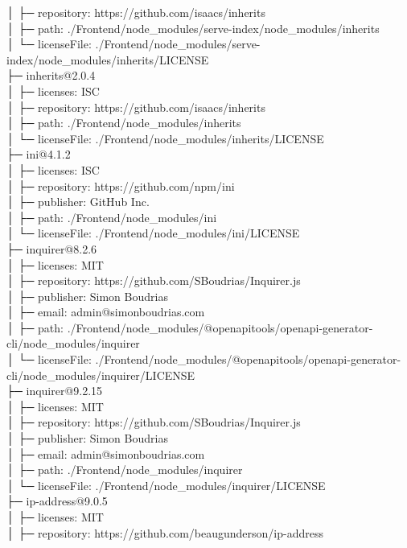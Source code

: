 │  ├─ repository: https://github.com/isaacs/inherits\\
│  ├─ path: ./Frontend/node\_modules/serve-index/node\_modules/inherits\\
│  └─ licenseFile: ./Frontend/node\_modules/serve-index/node\_modules/inherits/LICENSE\\
├─ inherits@2.0.4\\
│  ├─ licenses: ISC\\
│  ├─ repository: https://github.com/isaacs/inherits\\
│  ├─ path: ./Frontend/node\_modules/inherits\\
│  └─ licenseFile: ./Frontend/node\_modules/inherits/LICENSE\\
├─ ini@4.1.2\\
│  ├─ licenses: ISC\\
│  ├─ repository: https://github.com/npm/ini\\
│  ├─ publisher: GitHub Inc.\\
│  ├─ path: ./Frontend/node\_modules/ini\\
│  └─ licenseFile: ./Frontend/node\_modules/ini/LICENSE\\
├─ inquirer@8.2.6\\
│  ├─ licenses: MIT\\
│  ├─ repository: https://github.com/SBoudrias/Inquirer.js\\
│  ├─ publisher: Simon Boudrias\\
│  ├─ email: admin@simonboudrias.com\\
│  ├─ path: ./Frontend/node\_modules/@openapitools/openapi-generator-cli/node\_modules/inquirer\\
│  └─ licenseFile: ./Frontend/node\_modules/@openapitools/openapi-generator-cli/node\_modules/inquirer/LICENSE\\
├─ inquirer@9.2.15\\
│  ├─ licenses: MIT\\
│  ├─ repository: https://github.com/SBoudrias/Inquirer.js\\
│  ├─ publisher: Simon Boudrias\\
│  ├─ email: admin@simonboudrias.com\\
│  ├─ path: ./Frontend/node\_modules/inquirer\\
│  └─ licenseFile: ./Frontend/node\_modules/inquirer/LICENSE\\
├─ ip-address@9.0.5\\
│  ├─ licenses: MIT\\
│  ├─ repository: https://github.com/beaugunderson/ip-address\\
